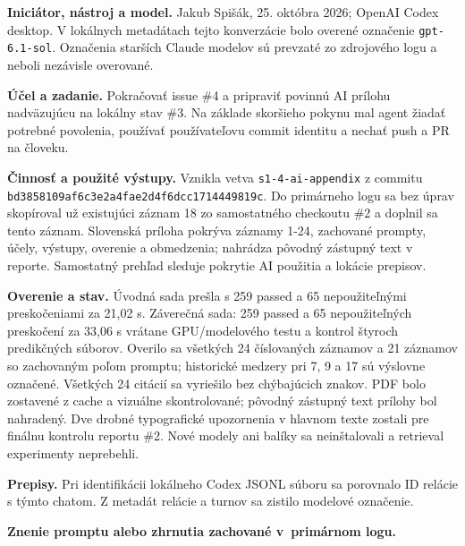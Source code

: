 \par\noindent \textbf{Iniciátor, nástroj a model.} Jakub Spišák, 25. októbra 2026; OpenAI Codex desktop. V lokálnych metadátach tejto konverzácie bolo overené označenie \texttt{gpt-\allowbreak{}6.\allowbreak{}1-\allowbreak{}sol}. Označenia starších Claude modelov sú prevzaté zo zdrojového logu a neboli nezávisle overované.\par\smallskip
\par\noindent \textbf{Účel a zadanie.} Pokračovať issue \#4 a pripraviť povinnú AI prílohu nadväzujúcu na lokálny stav \#3. Na základe skoršieho pokynu mal agent žiadať potrebné povolenia, používať používateľovu commit identitu a nechať push a PR na človeku.\par\smallskip
\par\noindent \textbf{Činnosť a použité výstupy.} Vznikla vetva \texttt{s1-\allowbreak{}4-\allowbreak{}ai-\allowbreak{}appendix} z commitu \texttt{bd3858109af6\allowbreak{}c3e2a4fae2d4\allowbreak{}f6dcc1714449\allowbreak{}819c}. Do primárneho logu sa bez úprav skopíroval už existujúci záznam 18 zo samostatného checkoutu \#2 a doplnil sa tento záznam. Slovenská príloha pokrýva záznamy 1-24, zachované prompty, účely, výstupy, overenie a obmedzenia; nahrádza pôvodný zástupný text v reporte. Samostatný prehľad sleduje pokrytie AI použitia a lokácie prepisov.\par\smallskip
\par\noindent \textbf{Overenie a stav.} Úvodná sada prešla s 259 passed a 65 nepoužiteľnými preskočeniami za 21,02 s. Záverečná sada: 259 passed a 65 nepoužiteľných preskočení za 33,06 s vrátane GPU/modelového testu a kontrol štyroch predikčných súborov. Overilo sa všetkých 24 číslovaných záznamov a 21 záznamov so zachovaným poľom promptu; historické medzery pri 7, 9 a 17 sú výslovne označené. Všetkých 24 citácií sa vyriešilo bez chýbajúcich znakov. PDF bolo zostavené z cache a vizuálne skontrolované; pôvodný zástupný text prílohy bol nahradený. Dve drobné typografické upozornenia v hlavnom texte zostali pre finálnu kontrolu reportu \#2. Nové modely ani balíky sa neinštalovali a retrieval experimenty neprebehli.\par\smallskip
\par\noindent \textbf{Prepisy.} Pri identifikácii lokálneho Codex JSONL súboru sa porovnalo ID relácie s týmto chatom. Z metadát relácie a turnov sa zistilo modelové označenie.\par\smallskip

\par\noindent\textbf{Znenie promptu alebo zhrnutia zachované v~primárnom logu.}

